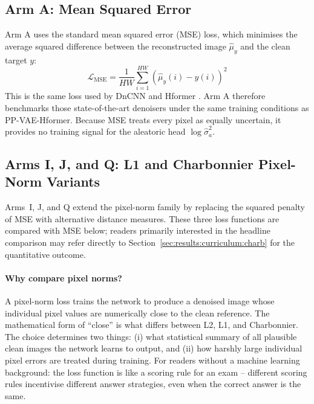 \documentclass[12pt, a4paper, twoside, openright]{book}
\begin{document}
\subsection{Arm A: Mean Squared Error}
\label{sec:methods:loss:mse}

Arm A uses the standard mean squared error (MSE) loss, which minimises the average
squared difference between the reconstructed image $\hat{\mu}_y$ and the clean target $y$:
\begin{equation}
\label{eq:methods:mse}
\mathcal{L}_{\mathrm{MSE}} = \frac{1}{HW}\sum_{i=1}^{HW}\left(\hat{\mu}_y(i) - y(i)\right)^2
\end{equation}
This is the same loss used by DnCNN \cite{zhang_beyond_2017} and Hformer
\cite{zhang_hformer_2023}. Arm A therefore benchmarks those state-of-the-art denoisers
under the same training conditions as PP-VAE-Hformer. Because MSE treats every pixel as
equally uncertain, it provides no training signal for the aleatoric head $\log\hat{\sigma}^2_a$.

\subsection{Arms I, J, and Q: L1 and Charbonnier Pixel-Norm Variants}
\label{sec:methods:loss:l1charbonnier}

Arms~I, J, and Q extend the pixel-norm family by replacing the squared penalty of MSE with alternative distance measures. These three loss functions are compared with MSE below; readers primarily interested in the headline comparison may refer directly to Section~\ref{sec:results:curriculum:charb} for the quantitative outcome.

\paragraph{Why compare pixel norms?}
A pixel-norm loss trains the network to produce a denoised image whose individual pixel values are numerically close to the clean reference. The mathematical form of ``close'' is what differs between L2, L1, and Charbonnier. The choice determines two things: (i) what statistical summary of all plausible clean images the network learns to output, and (ii) how harshly large individual pixel errors are treated during training. For readers without a machine learning background: the loss function is like a scoring rule for an exam -- different scoring rules incentivise different answer strategies, even when the correct answer is the same.
\end{document}
